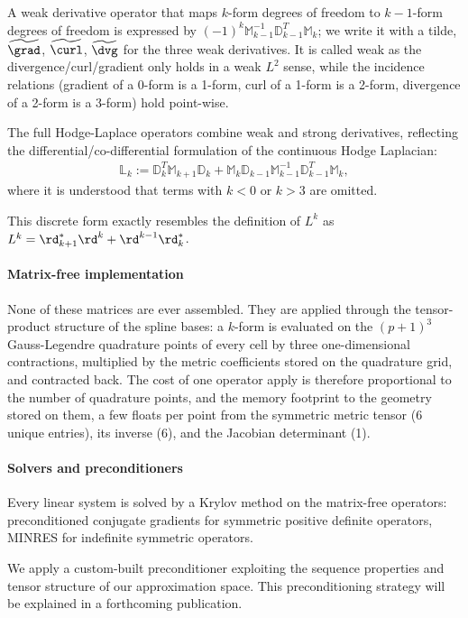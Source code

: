 \documentclass[%
 reprint,
 superscriptaddress,
 amsmath,amssymb,
 aps, nofootinbib, floatfix]{revtex4-2}
\begin{document}
A weak derivative operator that maps $k$-form degrees of freedom to $k-1$-form degrees of freedom is expressed by $(-1)^k \mathbb M_{k-1}^{-1} \mathbb D_{k-1}^T \mathbb M_{k}$; we write it with a tilde, $\widetilde{\grad}$, $\widetilde{\curl}$, $\widetilde{\dvg}$ for the three weak derivatives. It is called weak as the divergence/curl/gradient only holds in a weak $L^2$ sense, while the incidence relations (gradient of a 0-form is a 1-form, curl of a 1-form is a 2-form, divergence of a 2-form is a 3-form) hold point-wise.   

The full Hodge-Laplace operators combine weak and strong derivatives, reflecting the differential/co-differential formulation of the continuous Hodge Laplacian:
\begin{align}
    \mathbb L_k := \mathbb D_k^T \mathbb M_{k+1} \mathbb D_k + \mathbb M_{k} \mathbb D_{k-1} \mathbb M_{k-1}^{-1} \mathbb D_{k-1}^T \mathbb M_{k}, \label{eq:hodge_laplacian_matrix}
\end{align}
where it is understood that terms with $k<0$ or $k>3$ are omitted.

This discrete form exactly resembles the definition of $L^k$ as $L^k = \rd^*_{k+1} \rd^k + \rd^{k-1} \rd^*_k$.


\paragraph{Matrix-free implementation}
None of these matrices are ever assembled. They are applied through the tensor-product structure of the spline bases: a $k$-form is evaluated on the $(p+1)^3$ Gauss-Legendre quadrature points of every cell by three one-dimensional contractions, multiplied by the metric coefficients stored on the quadrature grid, and contracted back. The cost of one operator apply is therefore proportional to the number of quadrature points, and the memory footprint to the geometry stored on them, a few floats per point from the symmetric metric tensor (6 unique entries), its inverse (6), and the Jacobian determinant (1).

\paragraph{Solvers and preconditioners}
Every linear system is solved by a Krylov method on the matrix-free operators: preconditioned conjugate gradients for symmetric positive definite operators, MINRES for indefinite symmetric operators. 

We apply a custom-built preconditioner exploiting the sequence properties and tensor structure of our approximation space. This preconditioning strategy will be explained in a forthcoming publication.
\end{document}
